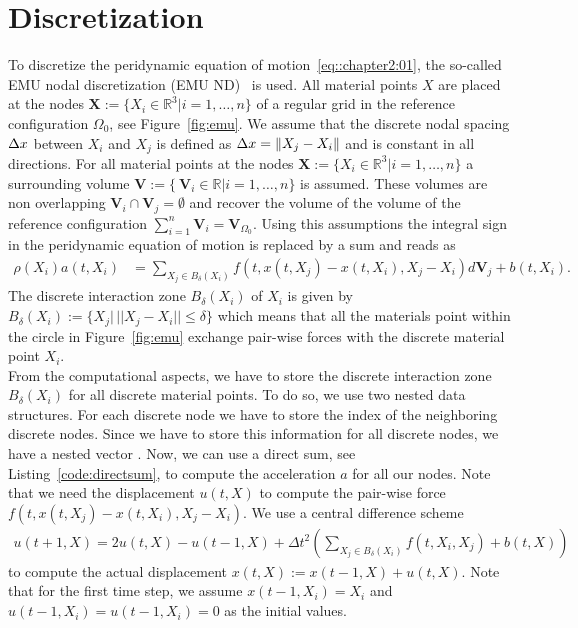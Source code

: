 \section{Discretization}
To discretize the peridynamic equation of motion~\eqref{eq::chapter2:01}, the so-called EMU nodal discretization (EMU ND)~\cite{parks2008implementing} is used. All material points $X$ are placed at the nodes $\mathbf{X}:=\lbrace X_i \in \mathbb{R}^3\vert i=1,\ldots,n\rbrace$ of a regular grid in the reference configuration $\Omega_0$, see Figure~\ref{fig:emu}. We assume that the  discrete nodal spacing ${\Delta x}$ between $X_i$ and $X_j$ is defined as ${\Delta x} = \Vert X_j - X_i \Vert$ and is constant in all directions. For all material points at the nodes $\mathbf{X}:=\lbrace X_i \in \mathbb{R}^3\vert i=1,\ldots,n\rbrace$ a surrounding volume $\mathbf{V}:=\lbrace\ \mathbf{V}_i \in \mathbb{R}\vert i=1,\ldots,n\rbrace$ is assumed. These volumes are non overlapping $\mathbf{V}_i \cap \mathbf{V}_j = \emptyset$ and recover the volume of the volume of the reference configuration $\sum_{i=1}^n \mathbf{V}_i = \mathbf{V}_{\Omega_0}$. Using this assumptions the integral sign in the peridynamic equation of motion is replaced by a sum and reads as
\begin{align}
\rho(X_i)a(t,X_i)&=\sum\limits_{X_j\in B_\delta(X_i)}  f\left(t,x(t,X_j)-x(t,X_i), X_j-X_i\right)d\mathbf{V}_j + b(t,X_i) \text{.}
\end{align}
The discrete interaction zone $B_\delta(X_i)$ of $X_i$ is given by $B_\delta(X_i):=\lbrace X_j \vert \,\vert\vert X_j-X_i\vert\vert \leq \delta\rbrace$ which means that all the materials point within the circle in Figure~\ref{fig:emu} exchange pair-wise forces with the discrete material point $X_i$.\\

From the computational aspects, we have to store the discrete interaction zone $B_\delta(X_i)$ for all discrete material points. To do so, we use two nested  data structures. For each discrete node we have  to store the index of the neighboring discrete nodes. Since we have to store this information for all discrete nodes, we have a nested vector . Now, we can use a direct sum, see Listing~\ref{code:directsum}, to compute the acceleration $a$ for all our nodes. Note that we need the displacement 
$u(t,X)$ to compute the pair-wise force $f\left(t,x(t,X_j)-x(t,X_i), X_j-X_i\right)$. We use a central difference scheme 
\begin{align}
u(t+1,X) =  2 u(t,X) - u(t-1,X) + \Delta t^2 \left(\sum\limits_{X_j\in B_\delta(X_i)} f(t,X_i,X_j)+b(t,X)\right)
\end{align}
to compute the actual displacement $x(t,X):= x(t-1,X) + u(t,X)$. Note that for the first time step, we assume $x(t-1,X_i)=X_i$ and $u(t-1,X_i)=u(t-1,X_i)=0$ as the initial values.

